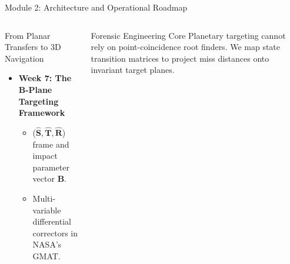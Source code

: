 \documentclass[aspectratio=169, 10pt]{beamer}
\begin{document}
\begin{frame}{Module 2: Architecture and Operational Roadmap}
\begin{columns}[T]
\begin{column}{0.64\textwidth}
\begin{block}{From Planar Transfers to 3D Navigation}
\begin{itemize}
                    \begin{itemize}\setlength{\itemsep}{0pt}
                        \item Planetary SOI momentum transfer; turn angle $\delta_{\text{turn}}(r_p)$.
                        \item Leading vs. Trailing encounters and deep-space Oberth burns.
                    \end{itemize}
                    \item \textbf{Week 7: The B-Plane Targeting Framework}
                    \begin{itemize}\setlength{\itemsep}{0pt}
                        \item ($\hat{\mathbf{S}}, \hat{\mathbf{T}}, \hat{\mathbf{R}}$) frame and impact parameter vector $\mathbf{B}$.
                        \item Multi-variable differential correctors in NASA's GMAT.
                    \end{itemize}
                \end{itemize}
            \end{block}
        \end{column}
        
        \begin{column}{0.34\textwidth}
            \begin{alertblock}{Forensic Engineering Core}
                \scriptsize
                Planetary targeting cannot rely on point-coincidence root finders. We map state transition matrices to project miss distances onto invariant target planes.
            \end{alertblock}
            \vspace{0.2cm}
            \centering
        \end{column}
    \end{columns}
\end{frame}
\end{document}
